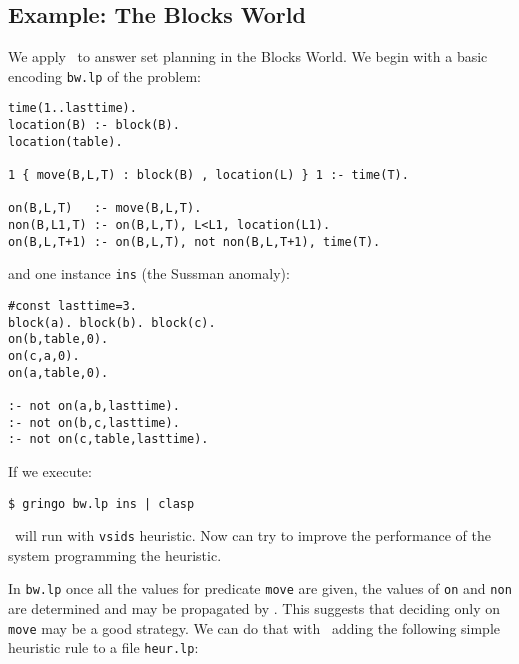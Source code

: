 \subsection{Example: The Blocks World}

 We apply \clasp\ to answer set planning in the Blocks World.  We begin with a basic encoding \texttt{bw.lp} of the problem: 
\begin{verbatim}
time(1..lasttime).                                                                                                                                                                                         
location(B) :- block(B).                                                                                            
location(table).                                                                                                    
                                                                                                                    
1 { move(B,L,T) : block(B) , location(L) } 1 :- time(T).                                           
                                                                                                                    
on(B,L,T)   :- move(B,L,T).                                                                             
non(B,L1,T) :- on(B,L,T), L<L1, location(L1). 
on(B,L,T+1) :- on(B,L,T), not non(B,L,T+1), time(T). \end{verbatim}

 and one instance \texttt{ins} (the Sussman anomaly): 
\begin{verbatim}
#const lasttime=3.
block(a). block(b). block(c).
on(b,table,0). 
on(c,a,0).
on(a,table,0).

:- not on(a,b,lasttime).
:- not on(b,c,lasttime).
:- not on(c,table,lasttime).
\end{verbatim}

If we execute:
\begin{verbatim}
$ gringo bw.lp ins | clasp \end{verbatim}

\clasp\ will run with \texttt{vsids} heuristic. Now can try to improve the performance of the system programming the heuristic. 

 In \texttt{bw.lp} once all the values for predicate \texttt{move} are given,  
 the values of \texttt{on} and \texttt{non} are determined and may be propagated by \clasp. 
 This suggests that deciding only on \texttt{move} may be a good strategy. 
 We can do that with \clasp\ adding the following simple heuristic rule to a file \texttt{heur.lp}: 

